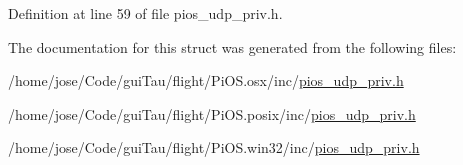 Definition at line 59 of file pios\-\_\-udp\-\_\-priv.\-h.



The documentation for this struct was generated from the following files\-:\begin{DoxyCompactItemize}
\item 
/home/jose/\-Code/gui\-Tau/flight/\-Pi\-O\-S.\-osx/inc/\hyperlink{_pi_o_s_8osx_2inc_2pios__udp__priv_8h}{pios\-\_\-udp\-\_\-priv.\-h}\item 
/home/jose/\-Code/gui\-Tau/flight/\-Pi\-O\-S.\-posix/inc/\hyperlink{_pi_o_s_8posix_2inc_2pios__udp__priv_8h}{pios\-\_\-udp\-\_\-priv.\-h}\item 
/home/jose/\-Code/gui\-Tau/flight/\-Pi\-O\-S.\-win32/inc/\hyperlink{_pi_o_s_8win32_2inc_2pios__udp__priv_8h}{pios\-\_\-udp\-\_\-priv.\-h}\end{DoxyCompactItemize}
